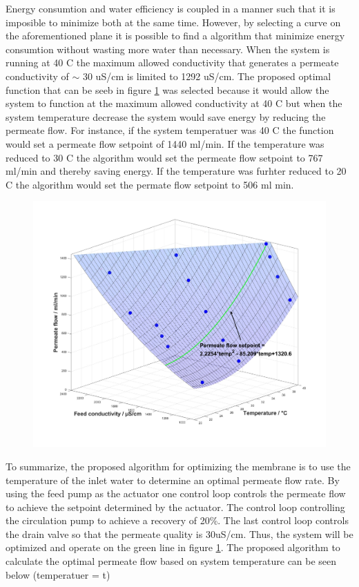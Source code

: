Energy consumtion and water efficiency is coupled in a manner such that it is imposible to minimize both at the same time. However, by selecting a curve on the aforementioned plane it is possible to find a algorithm that minimize energy consumtion without wasting more water than necessary. When the system is running at 40 C the maximum allowed conductivity that generates a permeate conductivity of  $\sim$ 30 uS/cm is limited to 1292 uS/cm. The proposed optimal function that can be seeb in figure \ref{fig:FinalResult_4} was selected because it would allow the system to function at the maximum allowed conductivity at 40 C but when the system temperature decrease the system would save energy by reducing the permeate flow. For instance, if the system temperatuer was 40 C the function would set a permeate flow setpoint of 1440 ml/min. If the temperature was reduced to 30 C the algorithm would set the permeate flow setpoint to  767 ml/min and thereby saving energy. If the temperature was furhter reduced to 20 C the algorithm would set the permate flow setpoint to 506 ml min. 


\begin{figure}[H]
    \centering
    \includegraphics[width=1.1\textwidth]{FinalResult_4}
    \caption{}
    \label{fig:FinalResult_4}
\end{figure}

To summarize, the proposed algorithm for optimizing the membrane is to use the temperature of the inlet water to determine an optimal permeate flow rate. By using the feed pump as the actuator one control loop controls the permeate flow to achieve the setpoint determined by the actuator. The control loop controlling the circulation pump to achieve a recovery of 20\%. The last control loop controls the drain valve so that the permeate quality is 30uS/cm. Thus, the system will be optimized and operate on the green line in figure \ref{fig:FinalResult_4}. The proposed algorithm to calculate the optimal permeate flow based on system temperature can be seen below (temperatuer = t)

